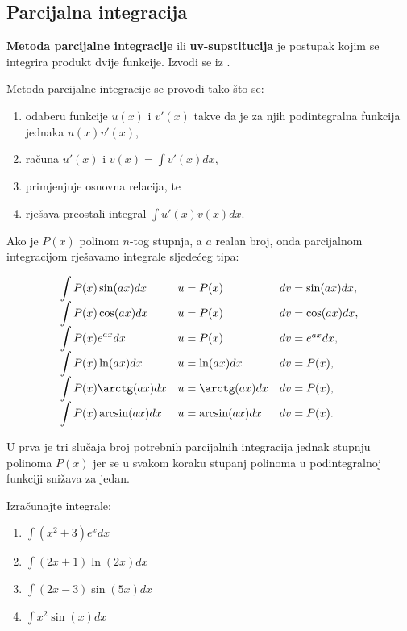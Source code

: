\subsection{Parcijalna integracija}

\textbf{Metoda parcijalne integracije} ili \textbf{uv-supstitucija} je postupak
kojim se integrira produkt dvije funkcije. Izvodi se iz .

Metoda parcijalne integracije se provodi tako što se:
\begin{enumerate}
    \item odaberu funkcije $u(x)$ i $v'(x)$ takve da je za njih podintegralna
    funkcija jednaka $u(x)v'(x)$,
    \item računa $u'(x)$ i $v(x) = \int v'(x)dx$,
    \item primjenjuje osnovna relacija, te
    \item rješava preostali integral $\int u'(x)v(x) dx$.
\end{enumerate}

Ako je $P(x)$ polinom $n$-tog stupnja, a $a$ realan broj, onda parcijalnom
integracijom rješavamo integrale sljedećeg tipa:

$$
\begin{array}{lll}
    \displaystyle \int P(x)\sin(ax)dx & u=P(x) & dv=\sin(ax)dx,\\
    \displaystyle \int P(x)\cos(ax)dx & u=P(x) & dv=\cos(ax)dx,\\
    \displaystyle \int P(x)e^{ax}dx & u=P(x) & dv=e^{ax}dx,\\
    \displaystyle \int P(x)\ln(ax)dx & u=\ln(ax)dx & dv=P(x),\\
    \displaystyle \int P(x)\arctg(ax)dx & u=\arctg(ax)dx & dv=P(x),\\
    \displaystyle \int P(x)\arcsin(ax)dx & u=\arcsin(ax)dx & dv=P(x).
\end{array}
$$

U prva je tri slučaja broj potrebnih parcijalnih integracija jednak stupnju
polinoma $P(x)$ jer se u svakom koraku stupanj polinoma u podintegralnoj
funkciji snižava za jedan.

\begin{example}
    Izračunajte integrale:
    \begin{enumerate}
        \item $\displaystyle \int (x^2+3)e^xdx$
        \item $\displaystyle \int (2x+1)\ln(2x)dx$
        \item $\displaystyle \int (2x-3)\sin(5x) dx$
        \item $\displaystyle \int x^2\sin(x)dx$
    \end{enumerate}
\end{example}

